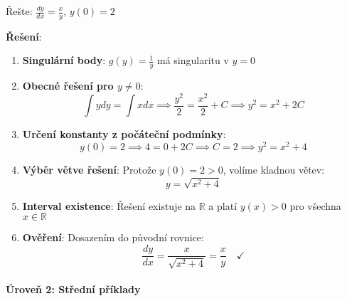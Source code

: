 \begin{example}
    Řešte: $\frac{dy}{dx} = \frac{x}{y}$, $y(0) = 2$
    
    \vspace{0.3\baselineskip}
    
    \textbf{Řešení}: 
    \begin{enumerate}
    \item \textbf{Singulární body}: $g(y) = \frac{1}{y}$ má singularitu v $y = 0$
    
    \item \textbf{Obecné řešení pro $y \neq 0$}: 
    \[
    \int y  dy = \int x  dx \implies \frac{y^2}{2} = \frac{x^2}{2} + C \implies y^2 = x^2 + 2C
    \]
    
    \item \textbf{Určení konstanty z počáteční podmínky}:
    \[
    y(0) = 2 \implies 4 = 0 + 2C \implies C = 2 \implies y^2 = x^2 + 4
    \]
    
    \item \textbf{Výběr větve řešení}: Protože $y(0) = 2 > 0$, volíme kladnou větev:
    \[
    y = \sqrt{x^2 + 4}
    \]
    
    \item \textbf{Interval existence}: Řešení existuje na $\mathbb{R}$ a platí $y(x) > 0$ pro všechna $x \in \mathbb{R}$
    
    \item \textbf{Ověření}: Dosazením do původní rovnice:
    \[
    \frac{dy}{dx} = \frac{x}{\sqrt{x^2 + 4}} = \frac{x}{y} \quad \checkmark
    \]
    \end{enumerate}
    \end{example}

\vspace{0.8\baselineskip}

\paragraph*{Úroveň 2: Střední příklady}

